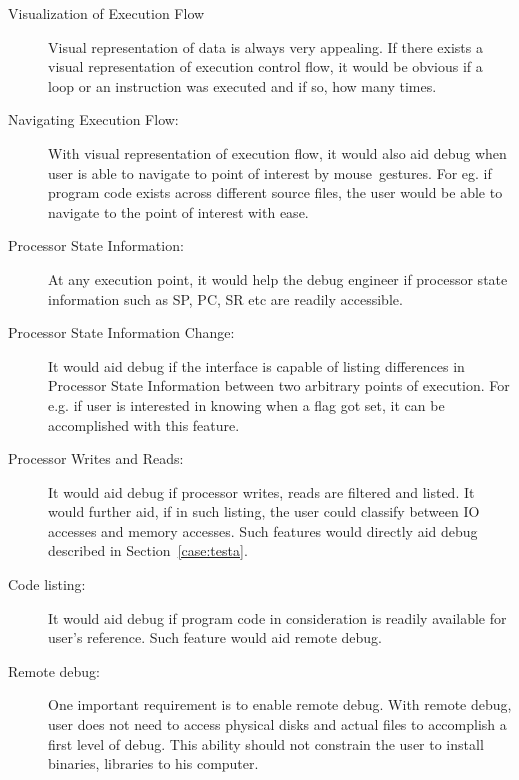 \begin{description}
\item[Visualization of Execution Flow] Visual representation of data is always very appealing. If there exists a visual representation of execution control flow, it would be obvious if a loop or an instruction was executed and if so, how many times.
\item[Navigating Execution Flow:] With visual representation of execution flow, it would also aid debug when user is able to navigate to point of interest by mouse~gestures. For eg. if program code exists across different source files, the user would be able to navigate to the point of interest with ease.
\item[Processor State Information:] At any execution point, it would help the debug engineer if processor state information such as SP, PC, SR etc are readily accessible.
\item[Processor State Information Change:] It would aid debug if the interface is capable of listing differences in Processor State Information between two arbitrary points of execution. For e.g. if user is interested in knowing when a flag got set, it can be accomplished with this feature.
\item[Processor Writes and Reads:] It would aid debug if processor writes, reads are filtered and listed. It would further aid, if in such listing, the user could classify between IO accesses and memory accesses. Such features would directly aid debug described in Section~\ref{case:testa}.
\item[Code listing:] It would aid debug if program code in consideration is readily available for user's reference. Such feature would aid remote debug.
\item[Remote debug:] One important requirement is to enable remote debug. With remote debug, user does not need to access physical disks and actual files to accomplish a first level of debug. This ability should not constrain the user to install binaries, libraries to his computer.
\end{description}


